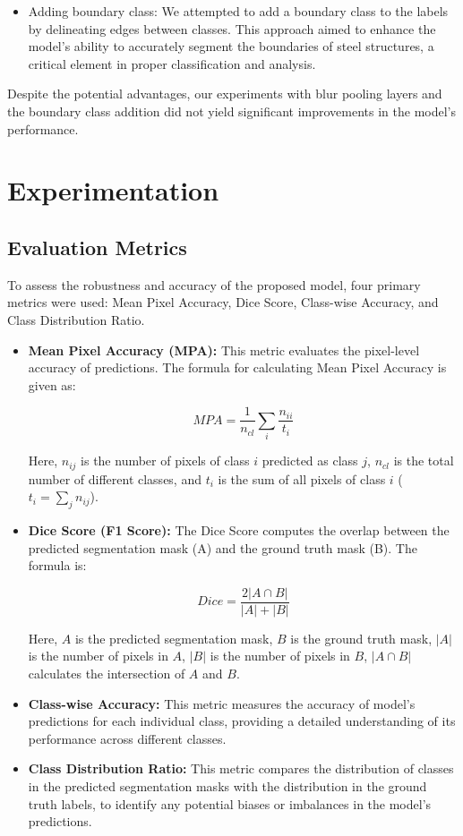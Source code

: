\documentclass[]{article}
\begin{document}
\begin{itemize}
\begin{itemize}
		\item Adding boundary class: We attempted to add a boundary class to the labels by delineating edges between classes. This approach aimed to enhance the model's ability to accurately segment the boundaries of steel structures, a critical element in proper classification and analysis.
	\end{itemize}
	Despite the potential advantages, our experiments with blur pooling layers and the boundary class addition did not yield significant improvements in the model's performance.
\end{itemize}

\section{Experimentation}
\subsection{Evaluation Metrics}

To assess the robustness and accuracy of the proposed model, four primary metrics were used: Mean Pixel Accuracy, Dice Score, Class-wise Accuracy, and Class Distribution Ratio.

\begin{itemize}
	\item \textbf{Mean Pixel Accuracy (MPA):} This metric evaluates the pixel-level accuracy of predictions. The formula for calculating Mean Pixel Accuracy is given as:
	
	\[ MPA = \frac{1}{n_{cl}} \sum_{i} \frac{n_{ii}}{t_i} \]
	
	Here, $n_{ij}$ is the number of pixels of class $i$ predicted as class $j$, $n_{cl}$ is the total number of different classes, and $t_{i}$ is the sum of all pixels of class $i$ ($t_{i} = \sum_{j} n_{ij}$).
	
	\item \textbf{Dice Score (F1 Score):} The Dice Score computes the overlap between the predicted segmentation mask (A) and the ground truth mask (B). The formula is:
	
	\[ Dice = \frac{2 |A \cap B|}{|A| + |B|} \]
	
	Here, $A$ is the predicted segmentation mask, $B$ is the ground truth mask, $|A|$ is the number of pixels in $A$, $|B|$ is the number of pixels in $B$, $|A \cap B|$ calculates the intersection of $A$ and $B$.
	
	\item \textbf{Class-wise Accuracy:} This metric measures the accuracy of model's predictions for each individual class, providing a detailed understanding of its performance across different classes.
	
	\item \textbf{Class Distribution Ratio:} This metric compares the distribution of classes in the predicted segmentation masks with the distribution in the ground truth labels, to identify any potential biases or imbalances in the model's predictions.
\end{itemize}
\end{document}
